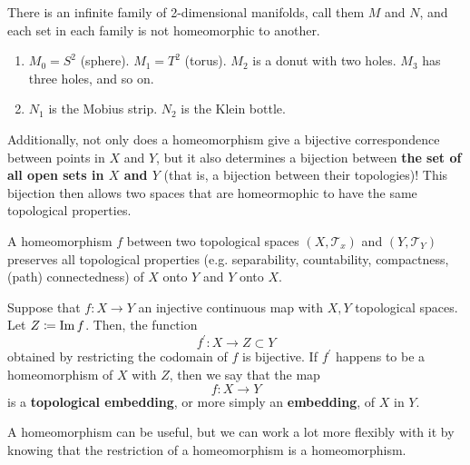   \begin{example}
    There is an infinite family of 2-dimensional manifolds, call them $M$ and $N$, and each set in each family is not homeomorphic to another.  
    \begin{enumerate}
      \item $M_0 = S^2$ (sphere). $M_1 = T^2$ (torus). $M_2$ is a donut with two holes. $M_3$ has three holes, and so on. 
      \item $N_1$ is the Mobius strip. $N_2$ is the Klein bottle. 
    \end{enumerate}
  \end{example}

  Additionally, not only does a homeomorphism give a bijective correspondence between points in $X$ and $Y$, but it also determines a bijection between \textbf{the set of all open sets in $X$ and $Y$} (that is, a bijection between their topologies)! This bijection then allows two spaces that are homeormophic to have the same topological properties. 

  \begin{theorem}
    A homeomorphism $f$ between two topological spaces $(X, \mathscr{T}_{x})$ and $(Y, \mathscr{T}_{Y})$ preserves all topological properties (e.g. separability, countability, compactness, (path) connectedness) of $X$ onto $Y$ and $Y$ onto $X$. 
  \end{theorem}

  \begin{definition}[Embedding]
    Suppose that $f: X \longrightarrow Y$ an injective continuous map with $X, Y$ topological spaces. Let $Z \coloneqq \operatorname{Im}{f}$. Then, the function
    \begin{equation}
      f^\prime: X \longrightarrow Z \subset Y
    \end{equation}
    obtained by restricting the codomain of $f$ is bijective. If $f^\prime$ happens to be a homeomorphism of $X$ with $Z$, then we say that the map
    \begin{equation}
      f: X \longrightarrow Y
    \end{equation}
    is a \textbf{topological embedding}, or more simply an \textbf{embedding}, of $X$ in $Y$. 
  \end{definition} 

  A homeomorphism can be useful, but we can work a lot more flexibly with it by knowing that the restriction of a homeomorphism is a homeomorphism. 

